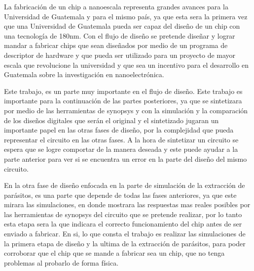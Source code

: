 
La fabricación de un chip a nanoescala representa grandes avances para la Universidad de Guatemala y para el mismo país, ya que esta sera la primera vez que una Universidad de Guatemala pueda ser capaz del diseño de un chip con una tecnología de 180nm. Con el flujo de diseño se pretende diseñar y lograr mandar a fabricar chips que sean diseñados por medio de un programa de descriptor de hardware y que pueda ser utilizado para un proyecto de mayor escala que revolucione la universidad y que sea un incentivo para el desarrollo en Guatemala sobre la investigación en nanoelectrónica.

Este trabajo, es un parte muy importante en el flujo de diseño. Este trabajo es importante para la continuación de las partes posteriores, ya que se sintetizara por medio de las herramientas de synopsys y con la simulación y la comparación de los diseños digitales que serán el original y el sintetizado jugaran un importante papel en las otras fases de diseño, por la complejidad que pueda representar el circuito en las otras fases. A la hora de sintetizar un circuito se espera que se logre comportar de la manera deseada y este puede ayudar a la parte anterior para ver si se encuentra un error en la parte del diseño del mismo circuito.

En la otra fase de diseño enfocada en la parte de simulación de la extracción de parásitos, es una parte que depende de todas las fases anteriores, ya que este mirara las simulaciones, en donde mostrara las respuestas mas reales posibles por las herramientas de synopsys del circuito que se pretende realizar, por lo tanto esta etapa sera la que indicara el correcto funcionamiento del chip antes de ser enviado a fabricar.
En si, lo que consta el trabajo es realizar las simulaciones de la primera etapa de diseño y la ultima de la extracción de parásitos, para poder corroborar que el chip que se mande a fabricar sea un chip, que no tenga problemas al probarlo de forma física.








